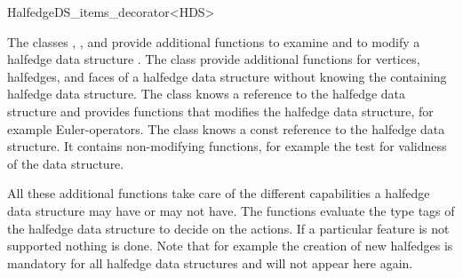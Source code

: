 
\ccRefPageBegin



\begin{ccRefClass}{HalfedgeDS_items_decorator<HDS>}

\ccDefinition

The classes ,
, and
 provide additional functions
to examine and to modify a halfedge data structure . The class
 provide additional functions
for vertices, halfedges, and faces of a halfedge data structure
without knowing the containing halfedge data structure. The class
 knows a reference to the halfedge
data structure and provides functions that modifies the halfedge data
structure, for example Euler-operators. The class
 knows a const reference to
the halfedge data structure. It contains non-modifying functions, for
example the test for validness of the data structure.

All these additional functions take care of the different capabilities
a halfedge data structure may have or may not have.  The functions
evaluate the type tags of the halfedge data structure to decide on the
actions. If a particular feature is not supported nothing is done.
Note that for example the creation of new halfedges is mandatory for
all halfedge data structures and will not appear here again.


\ccTypes

\ccThreeToTwo

\ccGlue
{}
\ccGlue
{}
\ccGlue
{}
\ccGlue
{}


\end{ccRefClass}
